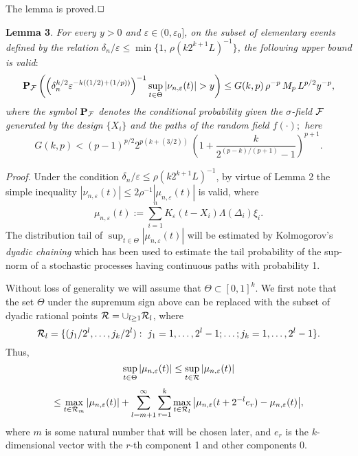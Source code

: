 \documentclass[12pt]{article}
\theoremstyle{remark}
\begin{document}
The lemma is proved.$\hfill\Box$




{\bf Lemma 3}. {\it For every $y>0$ and $\varepsilon\in(0, \varepsilon_0]$, on the subset of elementary events defined by the relation  $\delta_n/\varepsilon\le
\min\{1,\, \rho(k2^{k+1}L)^{-1}\}$, the following upper bound is valid$:$
\begin{eqnarray}\label{noise}
{\bf P}_{\cal F}\left (\Big(\delta_n^{k/2}\varepsilon^{-k((1/2)+(1/p))}\Big)^{-1} \sup\limits_{t\in \Theta}|\nu_{n,\varepsilon}(t)|>y\right )\le
G(k,p)\, \rho^{-p}\, M_p\, L^{p/2} y^{-p},
\end{eqnarray}
where the symbol ${\bf P}_{\cal F}$ denotes the conditional probability given the $\sigma$-field ${\cal F}$ generated by the design $\{X_i\}$ and the paths of the random field $f(\cdot)$$;$ here
$$G(k,p)< (p-1)^{p/2} 2^{p(k+(3/2))}
\,
\left( 1
+\frac{k}{2^{(p-k)/(p+1)} - 1}
\right)^{p+1}.
$$
}

{\it Proof.} Under the condition $\delta_n/\varepsilon\le \rho(k2^{k+1}L)^{-1}$,  by virtue of Lemma 2 the simple inequality
$|\nu_{n,\varepsilon}(t)|\le 2\rho^{-1}|\mu_{n,\varepsilon}(t)| $  is valid, where
$$
\mu_{n,\varepsilon}(t) := \sum\limits_{i=1}^nK_{\varepsilon}(t-X_{i})\Lambda(\Delta_i)\xi_{i}.
$$
The distribution tail of
$\sup_{t\in \Theta}|\mu_{n,\varepsilon}(t)|$
will be estimated by   Kolmogorov's  {\it dyadic chaining} %
 which has been used  to estimate the tail probability of the sup-norm of a stochastic processes
having continuous paths with probability 1.

Without loss of generality we will assume that $\Theta\subset [0,1]^k$.
We first note that
the set $\Theta$ under the supremum sign above can be replaced with the subset of dyadic rational points
${\cal R}=\cup_{l\ge 1} {\cal R}_l$,
where
$${\cal R}_l=\{(j_1/2^l,\dots,j_k/2^l):\  j_1=1,\dots, 2^l-1;\dots;
j_k=1,\ldots, 2^l-1 \}.$$
Thus,
$$\sup_{t\in \Theta}|\mu_{n,\varepsilon}(t)|
\le \sup_{t\in {\cal R}}|\mu_{n,\varepsilon}(t)|$$
$$\le \max_{t\in {\cal R}_m}|\mu_{n,\varepsilon}(t)| +
\sum_{l=m+1}^\infty
\sum_{r=1}^k
\max_{t\in {\cal R}_l}
\big|\mu_{n,\varepsilon}(t+2^{-l}e_r)-\mu_{n,\varepsilon}(t)\big|,
$$
where $m$ is some natural number that will be chosen later, and $e_r$ is the
$k$-dimensional vector with the $r$-th component 1 and other components 0.
\end{document}
